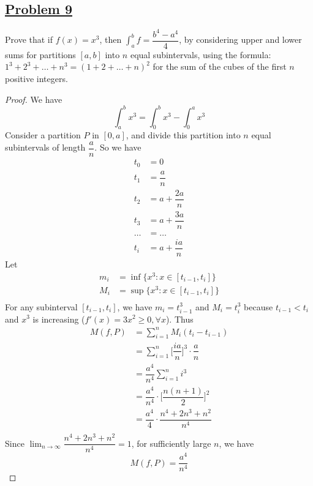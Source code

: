 \documentclass[10pt,letterpaper]{article}
\begin{document}
	\subsection*{{\color{purple}\underline{Problem 9}}}
	Prove that if $f(x) = x^3$, then $\displaystyle\int_{a}^{b} f = \dfrac{b^4 - a^4}{4}$, by considering
	upper and lower sums for partitions $[a, b]$ into $n$ equal subintervals, using the formula:
	$1^3 + 2^3 + \ldots + n^3 = (1 + 2 + \ldots + n)^2$ for the sum of the cubes of the first $n$
	positive integers.
	\begin{proof}
	We have
	$$\displaystyle\int_{a}^{b} x^3 = \displaystyle\int_{0}^{b} x^3 - \displaystyle\int_{0}^{a} x^3$$
	Consider a partition $P$ in $[0, a]$, and divide this partition into $n$ equal subintervals of length
	$\dfrac{a}{n}$. So we have
	\begin{align*}
		t_0 &= 0 \\
		t_1 &= \dfrac{a}{n} \\
		t_2 &= a + \dfrac{2a}{n} \\
		t_3 &= a + \dfrac{3a}{n} \\
	    \ldots &=  \ldots \\
		t_i &= a + \dfrac{ia}{n}
	\end{align*}
	Let 
	\begin{align*}
		m_i &= \inf\{x^3 : x \in [t_{i-1}, t_i]\} \\
		M_i &= \sup\{x^3 : x \in [t_{i-1}, t_i]\} \\
	\end{align*}
	For any subinterval $[t_{i-1}, t_i]$, we have $m_i = t_{i-1}^3$ and $M_i = t_i^3$ because $t_{i-1} < t_{i}$ and $x^3$ is
	increasing ($f'(x) = 3x^2 \geq 0, \forall x$). Thus
	\begin{align*}
		M(f, P) 
		 &= \displaystyle\sum_{i=1}^{n} M_i(t_{i} - t_{i-1}) \\
		 &= \displaystyle\sum_{i=1}^{n} \bigg[\dfrac{ia}{n} \bigg]^3 \cdot \dfrac{a}{n} \\	
		 &= \dfrac{a^4}{n^4} \displaystyle\sum_{i=1}^{n} i^3 \\ 
		 &= \dfrac{a^4}{n^4} \cdot \bigg[\dfrac{n(n + 1)}{2}\bigg]^2 \\
		 &= \dfrac{a^4}{4} \cdot \dfrac{n^4 + 2n^3 + n^2}{n^4} \\ 
	\end{align*}	
	Since $\displaystyle\lim_{n\to \infty} \dfrac{n^4 + 2n^3 + n^2}{n^4} = 1$, for sufficiently large $n$, we have
	$$M(f, P) = \dfrac{a^4}{n^4}$$

\end{proof}
\end{document}
